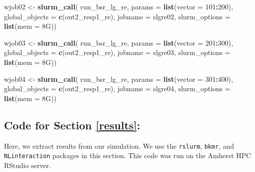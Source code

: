 \documentclass[12pt, twoside]{amherstthesis}
\newenvironment{Shaded}{\begin{snugshade}}{\end{snugshade}}
\newcommand{\AttributeTok}[1]{\textcolor[rgb]{0.13,0.29,0.53}{#1}}
\newcommand{\DecValTok}[1]{\textcolor[rgb]{0.00,0.00,0.81}{#1}}
\newcommand{\FunctionTok}[1]{\textcolor[rgb]{0.13,0.29,0.53}{\textbf{#1}}}
\newcommand{\NormalTok}[1]{#1}
\newcommand{\OtherTok}[1]{\textcolor[rgb]{0.56,0.35,0.01}{#1}}
\newcommand{\SpecialCharTok}[1]{\textcolor[rgb]{0.81,0.36,0.00}{\textbf{#1}}}
\newcommand{\StringTok}[1]{\textcolor[rgb]{0.31,0.60,0.02}{#1}}
\begin{document}
\begin{Shaded}
\begin{Highlighting}[]
\NormalTok{wjob02 }\OtherTok{\textless{}{-}} \FunctionTok{slurm\_call}\NormalTok{(}
\NormalTok{  run\_bsr\_lg\_re, }\AttributeTok{params =} \FunctionTok{list}\NormalTok{(}\AttributeTok{vector =} \DecValTok{101}\SpecialCharTok{:}\DecValTok{200}\NormalTok{),}
  \AttributeTok{global\_objects =} \FunctionTok{c}\NormalTok{(}\StringTok{\textquotesingle{}out2\_resp1\_re\textquotesingle{}}\NormalTok{),}
  \AttributeTok{jobname =} \StringTok{\textquotesingle{}slgre02\textquotesingle{}}\NormalTok{,}
  \AttributeTok{slurm\_options =} \FunctionTok{list}\NormalTok{(}\AttributeTok{mem =} \StringTok{\textquotesingle{}8G\textquotesingle{}}\NormalTok{))}

\NormalTok{wjob03 }\OtherTok{\textless{}{-}} \FunctionTok{slurm\_call}\NormalTok{(}
\NormalTok{  run\_bsr\_lg\_re, }\AttributeTok{params =} \FunctionTok{list}\NormalTok{(}\AttributeTok{vector =} \DecValTok{201}\SpecialCharTok{:}\DecValTok{300}\NormalTok{),}
  \AttributeTok{global\_objects =} \FunctionTok{c}\NormalTok{(}\StringTok{\textquotesingle{}out2\_resp1\_re\textquotesingle{}}\NormalTok{),}
  \AttributeTok{jobname =} \StringTok{\textquotesingle{}slgre03\textquotesingle{}}\NormalTok{,}
  \AttributeTok{slurm\_options =} \FunctionTok{list}\NormalTok{(}\AttributeTok{mem =} \StringTok{\textquotesingle{}8G\textquotesingle{}}\NormalTok{))}

\NormalTok{wjob04 }\OtherTok{\textless{}{-}} \FunctionTok{slurm\_call}\NormalTok{(}
\NormalTok{  run\_bsr\_lg\_re, }\AttributeTok{params =} \FunctionTok{list}\NormalTok{(}\AttributeTok{vector =} \DecValTok{301}\SpecialCharTok{:}\DecValTok{400}\NormalTok{),}
  \AttributeTok{global\_objects =} \FunctionTok{c}\NormalTok{(}\StringTok{\textquotesingle{}out2\_resp1\_re\textquotesingle{}}\NormalTok{),}
  \AttributeTok{jobname =} \StringTok{\textquotesingle{}slgre04\textquotesingle{}}\NormalTok{,}
  \AttributeTok{slurm\_options =} \FunctionTok{list}\NormalTok{(}\AttributeTok{mem =} \StringTok{\textquotesingle{}8G\textquotesingle{}}\NormalTok{))}
\end{Highlighting}
\end{Shaded}
\normalsize

\hypertarget{code-for-section-refresults}{%
\subsection{Code for Section \ref{results}:}\label{code-for-section-refresults}}

Here, we extract results from our simulation. We use the \texttt{rslurm}, \texttt{bkmr}, and \texttt{NLinteraction} packages in this section. This code was run on the Amherst HPC RStudio server.
\end{document}
